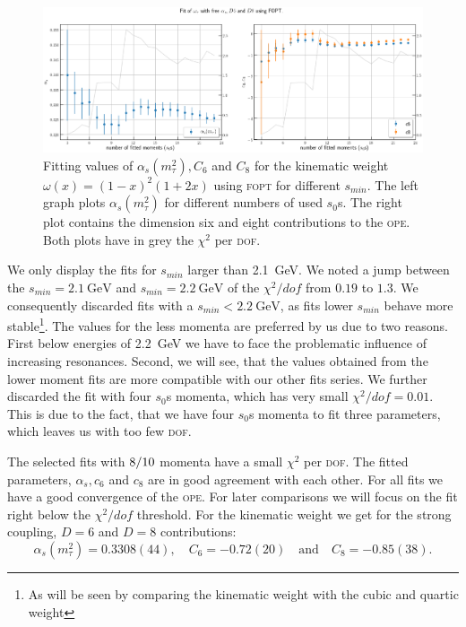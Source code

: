 \documentclass[../../index.tex]{subfiles}
\begin{document}
\begin{figure}
  \centering \includegraphics[width=\textwidth]{./images/fitWKinAlD6D8.eps}
  \caption{Fitting values of \(\alpha_s(m_\tau^2), C_6\) and \(C_8\) for the
    kinematic weight \(\omega(x)=(1-x)^2(1+2x)\) using \textsc{fopt} for
    different \(s_{min}\). The left graph plots \(\alpha_s(m_\tau^2)\) for
    different numbers of used \(s_0\)s. The right plot contains the dimension
    six and eight contributions to the \textsc{ope}. Both plots have in grey the
    \(\chi^2\) per \textsc{dof}.}
  \label{fig:fitWKinAlD6D8}
\end{figure}

We only display the fits for \(s_{min}\) larger than \SI{2.1}{\giga\eV}. We
noted a jump between the \(s_{min}=\SI{2.1}{\giga\eV}\) and
\(s_{min}=\SI{2.2}{\giga\eV}\) of the \(\chi^2/dof\) from \(0.19\) to \(1.3\).
We consequently discarded fits with a \(s_{min}<\SI{2.2}{\giga\eV}\), as fits
lower \(s_{min}\) behave more stable\footnote{As will be seen by comparing the
  kinematic weight with the cubic and quartic weight}. The values for the less
momenta are preferred by us due to two reasons. First below energies of
\SI{2.2}{\giga\eV} we have to face the problematic influence of increasing
resonances. Second, we will see, that the values obtained from the lower moment
fits are more compatible with our other fits series. We further discarded the
fit with four \(s_0\)s momenta, which has very small \(\chi^2/dof=0.01\). This
is due to the fact, that we have four \(s_0\)s momenta to fit three parameters,
which leaves us with too few \textsc{dof}.

The selected fits with \(8\-/10\) momenta have a small \(\chi^2\) per
\textsc{dof}. The fitted parameters, \(\alpha_s, c_6\) and \(c_8\) are in good
agreement with each other. For all fits we have a good convergence of the
\textsc{ope}. For later comparisons we will focus on the fit right below the
\(\chi^2/dof\) threshold. For the kinematic weight we get for the strong
coupling, \(D=6\) and \(D=8\) contributions:
\begin{equation}
  \label{eq:wKinResult}
  \alpha_s(m_\tau^2) = 0.3308(44), \quad C_6 = -0.72(20) \quad \text{and} \quad
  C_8 = -0.85(38).
\end{equation}
\end{document}
